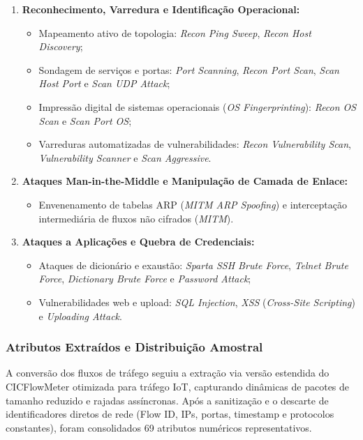 \begin{enumerate}
\begin{itemize}
        \item \emph{Ransomware} e \emph{Backdoors}: códigos maliciosos direcionados ao sequestro e controle não autorizado de dispositivos embarcados.
    \end{itemize}
    \item \textbf{Reconhecimento, Varredura e Identificação Operacional:}
    \begin{itemize}
        \item Mapeamento ativo de topologia: \emph{Recon Ping Sweep}, \emph{Recon Host Discovery};
        \item Sondagem de serviços e portas: \emph{Port Scanning}, \emph{Recon Port Scan}, \emph{Scan Host Port} e \emph{Scan UDP Attack};
        \item Impressão digital de sistemas operacionais (\emph{OS Fingerprinting}): \emph{Recon OS Scan} e \emph{Scan Port OS};
        \item Varreduras automatizadas de vulnerabilidades: \emph{Recon Vulnerability Scan}, \emph{Vulnerability Scanner} e \emph{Scan Aggressive}.
    \end{itemize}
    \item \textbf{Ataques Man-in-the-Middle e Manipulação de Camada de Enlace:}
    \begin{itemize}
        \item Envenenamento de tabelas ARP (\emph{MITM ARP Spoofing}) e interceptação intermediária de fluxos não cifrados (\emph{MITM}).
    \end{itemize}
    \item \textbf{Ataques a Aplicações e Quebra de Credenciais:}
    \begin{itemize}
        \item Ataques de dicionário e exaustão: \emph{Sparta SSH Brute Force}, \emph{Telnet Brute Force}, \emph{Dictionary Brute Force} e \emph{Password Attack};
        \item Vulnerabilidades web e upload: \emph{SQL Injection}, \emph{XSS} (\emph{Cross-Site Scripting}) e \emph{Uploading Attack}.
    \end{itemize}
\end{enumerate}

\subsubsection{Atributos Extraídos e Distribuição Amostral}

A conversão dos fluxos de tráfego seguiu a extração via versão estendida do CICFlowMeter otimizada para tráfego IoT, capturando dinâmicas de pacotes de tamanho reduzido e rajadas assíncronas. Após a sanitização e o descarte de identificadores diretos de rede (Flow ID, IPs, portas, timestamp e protocolos constantes), foram consolidados 69 atributos numéricos representativos.


